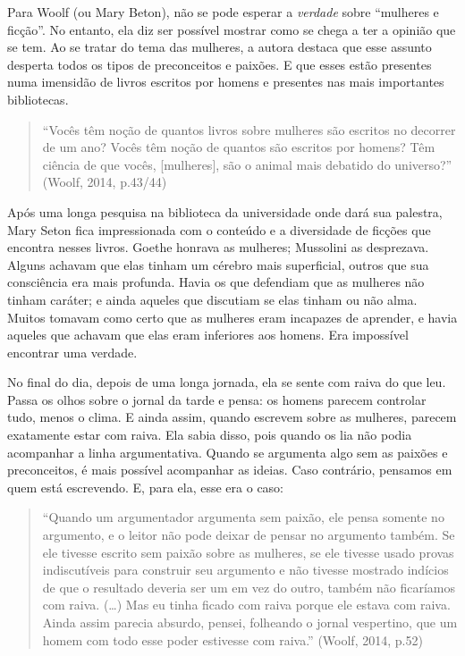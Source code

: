 Para Woolf (ou Mary Beton), não se pode esperar a \emph{verdade} sobre
``mulheres e ficção''. No entanto, ela diz ser possível mostrar como se
chega a ter a opinião que se tem. Ao se tratar do tema das mulheres, a
autora destaca que esse assunto desperta todos os tipos de preconceitos
e paixões. E que esses estão presentes numa imensidão de livros escritos
por homens e presentes nas mais importantes bibliotecas.

\begin{quote}
``Vocês têm noção de quantos livros sobre mulheres são escritos no
decorrer de um ano? Vocês têm noção de quantos são escritos por homens?
Têm ciência de que vocês, {[}mulheres{]}, são o animal mais debatido do
universo?'' (Woolf, 2014, p.43/44)
\end{quote}

Após uma longa pesquisa na biblioteca da universidade onde dará sua
palestra, Mary Seton fica impressionada com o conteúdo e a diversidade
de ficções que encontra nesses livros. Goethe honrava as mulheres;
Mussolini as desprezava. Alguns achavam que elas tinham um cérebro mais
superficial, outros que sua consciência era mais profunda. Havia os que
defendiam que as mulheres não tinham caráter; e ainda aqueles que
discutiam se elas tinham ou não alma. Muitos tomavam como certo que as
mulheres eram incapazes de aprender, e havia aqueles que achavam que
elas eram inferiores aos homens. Era impossível encontrar uma verdade.

No final do dia, depois de uma longa jornada, ela se sente com raiva do
que leu. Passa os olhos sobre o jornal da tarde e pensa: os homens
parecem controlar tudo, menos o clima. E ainda assim, quando escrevem
sobre as mulheres, parecem exatamente estar com raiva. Ela sabia disso,
pois quando os lia não podia acompanhar a linha argumentativa. Quando se
argumenta algo sem as paixões e preconceitos, é mais possível acompanhar
as ideias. Caso contrário, pensamos em quem está escrevendo. E, para
ela, esse era o caso:

\begin{quote}
``Quando um argumentador argumenta sem paixão, ele pensa somente no
argumento, e o leitor não pode deixar de pensar no argumento também. Se
ele tivesse escrito sem paixão sobre as mulheres, se ele tivesse usado
provas indiscutíveis para construir seu argumento e não tivesse mostrado
indícios de que o resultado deveria ser um em vez do outro, também não
ficaríamos com raiva. (\ldots{}) Mas eu tinha ficado com raiva porque ele
estava com raiva. Ainda assim parecia absurdo, pensei, folheando o
jornal vespertino, que um homem com todo esse poder estivesse com
raiva.'' (Woolf, 2014, p.52)
\end{quote}

